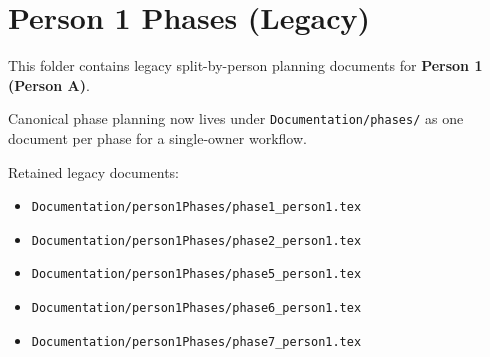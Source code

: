 \documentclass{article}
\begin{document}
\section*{Person 1 Phases (Legacy)}

This folder contains legacy split-by-person planning documents for
\textbf{Person 1 (Person A)}.

Canonical phase planning now lives under \texttt{Documentation/phases/}
as one document per phase for a single-owner workflow.

Retained legacy documents:
\begin{itemize}
\item \texttt{Documentation/person1Phases/phase1\_person1.tex}
\item \texttt{Documentation/person1Phases/phase2\_person1.tex}
\item \texttt{Documentation/person1Phases/phase5\_person1.tex}
\item \texttt{Documentation/person1Phases/phase6\_person1.tex}
\item \texttt{Documentation/person1Phases/phase7\_person1.tex}
\end{itemize}
\end{document}
